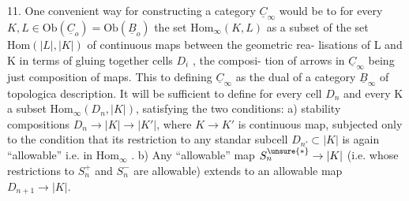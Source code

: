 

11. One convenient way for constructing  a category $\underline{C}_\infty$ would be to 
for every $K,L \in \mathrm{Ob}(\underline{C}_o) = \mathrm{Ob}(\underline{B}_o)$ the set $\mathrm{Hom}_\infty(K,L)$ as a subset of
the set $\mathrm{Hom}(|L|,|K|)$ of continuous maps  between the geometric rea-%
lisations of L and K in terms of gluing together cells $D_i$ , the composi-%
tion of arrows in $\underline{C}_\infty$ being just composition of maps. This  to
defining $\underline{C}_\infty$ as  the dual of a category $\underline{B}_\infty$ of topologica
description. It will be sufficient to define for every cell $D_n$ and
every K a subset $\mathrm{Hom}_\infty(D_n,|K|)$, satisfying the two conditions:
a) stability  compositions $D_n \to |K| \to |K'|$, where $K \to K'$
is  continuous map,  subjected only to the condition that its restriction
to any standar subcell $D_{n'} \subset |K|$ is again ``allowable'' i.e. in $\mathrm{Hom}_\infty$ .
b) Any ``allowable'' map $S_n^{\unsure{*}} \to |K|$ (i.e. whose restrictions to $S_n^+$ and
$S_n^-$ are allowable) extends to an allowable map $D_{n+1} \to |K|$.

